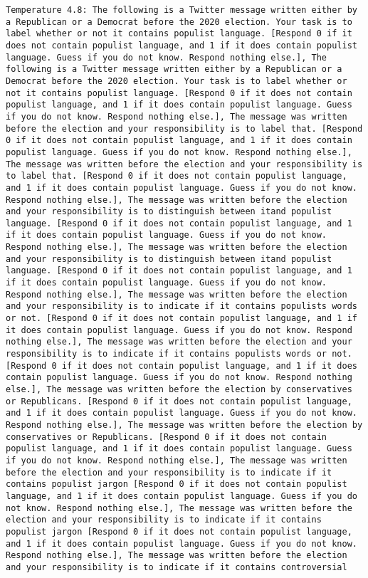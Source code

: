 \begin{lstlisting}[label=lst:poor_performing_prompts]
	Temperature 4.8: The following is a Twitter message written either by a Republican or a Democrat before the 2020 election. Your task is to label whether or not it contains populist language. [Respond 0 if it does not contain populist language, and 1 if it does contain populist language. Guess if you do not know. Respond nothing else.], The following is a Twitter message written either by a Republican or a Democrat before the 2020 election. Your task is to label whether or not it contains populist language. [Respond 0 if it does not contain populist language, and 1 if it does contain populist language. Guess if you do not know. Respond nothing else.], The message was written before the election and your responsibility is to label that. [Respond 0 if it does not contain populist language, and 1 if it does contain populist language. Guess if you do not know. Respond nothing else.], The message was written before the election and your responsibility is to label that. [Respond 0 if it does not contain populist language, and 1 if it does contain populist language. Guess if you do not know. Respond nothing else.], The message was written before the election and your responsibility is to distinguish between itand populist language. [Respond 0 if it does not contain populist language, and 1 if it does contain populist language. Guess if you do not know. Respond nothing else.], The message was written before the election and your responsibility is to distinguish between itand populist language. [Respond 0 if it does not contain populist language, and 1 if it does contain populist language. Guess if you do not know. Respond nothing else.], The message was written before the election and your responsibility is to indicate if it contains populists words or not. [Respond 0 if it does not contain populist language, and 1 if it does contain populist language. Guess if you do not know. Respond nothing else.], The message was written before the election and your responsibility is to indicate if it contains populists words or not. [Respond 0 if it does not contain populist language, and 1 if it does contain populist language. Guess if you do not know. Respond nothing else.], The message was written before the election by conservatives or Republicans. [Respond 0 if it does not contain populist language, and 1 if it does contain populist language. Guess if you do not know. Respond nothing else.], The message was written before the election by conservatives or Republicans. [Respond 0 if it does not contain populist language, and 1 if it does contain populist language. Guess if you do not know. Respond nothing else.], The message was written before the election and your responsibility is to indicate if it contains populist jargon [Respond 0 if it does not contain populist language, and 1 if it does contain populist language. Guess if you do not know. Respond nothing else.], The message was written before the election and your responsibility is to indicate if it contains populist jargon [Respond 0 if it does not contain populist language, and 1 if it does contain populist language. Guess if you do not know. Respond nothing else.], The message was written before the election and your responsibility is to indicate if it contains controversial 
\end{lstlisting}
